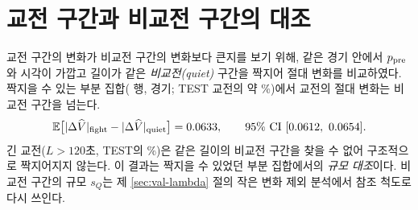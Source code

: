 \section{교전 구간과 비교전 구간의 대조}
\label{sec:value-quiet}

교전 구간의 변화가 비교전 구간의 변화보다 큰지를 보기 위해, 같은 경기 안에서 $p_{\mathrm{pre}}$와 시각이 가깝고 길이가 같은 \emph{비교전(quiet)} 구간을 짝지어 절대 변화를 비교하였다. 짝지을 수 있는 부분 집합(\numQuietMatched{} 행, \numQuietMatches{} 경기; TEST 교전의 약 \quietCoverage\%)에서 교전의 절대 변화는 비교전 구간을 넘는다.
\begin{equation}
  \mathbb{E}\bigl[|\Delta\widehat V|_{\mathrm{fight}} - |\Delta\widehat V|_{\mathrm{quiet}}\bigr] = 0.0633, \qquad 95\%\ \text{CI}\ [0.0612,\ 0.0654].
\end{equation}
긴 교전($L > 120$초, TEST의 \shareLongEng\%)은 같은 길이의 비교전 구간을 찾을 수 없어 구조적으로 짝지어지지 않는다. 이 결과는 짝지을 수 있었던 부분 집합에서의 \emph{규모 대조}이다. 비교전 구간의 규모 $s_Q$는 제 \ref{sec:val-lambda} 절의 작은 변화 제외 분석에서 참조 척도로 다시 쓰인다.
